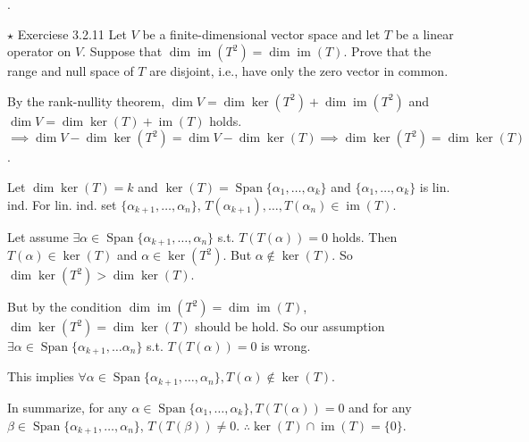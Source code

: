 \documentclass[8pt]{beamer}
\newcommand{\Span}{\operatorname{Span}}
\newcommand{\im}{\operatorname{im}}
\begin{document}
\begin{frame}{.}
    \begin{block}{$\star$ Exerciese 3.2.11}
        Let $V$ be a finite-dimensional vector space and let $T$ be a linear operator on $V$.
        Suppose that $\dim \im (T^2) = \dim \im (T)$.
        Prove that the range and null space of $T$ are disjoint, i.e., have only the zero vector in common.
    \end{block}

    By the rank-nullity theorem, $\dim V = \dim \ker (T^2) + \dim \im (T^2)$ and $\dim V = \dim \ker (T) + \im (T)$ holds.
    $\implies \dim V  -  \dim \ker (T^2) = \dim V - \dim \ker (T) \implies \dim \ker(T^2) = \dim \ker (T)$.



    Let $\dim \ker (T) = k$ and $\ker (T) = \Span \{\alpha_1, \dots, \alpha_k\}$ and $\{\alpha_1, \dots, \alpha_k\}$ is lin. ind.
    For lin. ind. set $\{\alpha_{k+1}, \dots, \alpha_n\}$, $T(\alpha_{k+1}), \dots, T(\alpha_n) \in \im(T)$.

    Let assume $\exists \alpha \in \Span \{\alpha_{k+1}, \dots, \alpha_n\}$ s.t. $T(T(\alpha)) = 0$ holds.
    Then $T(\alpha) \in \ker (T)$ and $\alpha \in \ker (T^2)$. 
    But $\alpha \notin \ker(T)$. 
    So $\dim \ker(T^2) > \dim \ker(T)$.

    But by the condition $\dim \im (T^2) = \dim \im (T)$, $\dim \ker (T^2) = \dim \ker (T)$ should be hold.
    So our assumption $\exists \alpha \in \Span \{\alpha_{k+1}, \dots \alpha_n\}$ s.t. $T(T(\alpha)) = 0$ is wrong.

    This implies $\forall \alpha \in \Span \{\alpha_{k+1}, \dots, \alpha_n\}, T(\alpha) \notin \ker(T)$.

    In summarize, for any $\alpha \in \Span \{\alpha_1, \dots, \alpha_k\}, T(T(\alpha)) = 0$ and for any $\beta \in \Span \{\alpha_{k+1}, \dots, \alpha_n\}$, $T(T(\beta)) \neq 0$. 
    $\therefore \ker(T) \cap \im(T) = \{0\}$.

\end{frame}
\end{document}

